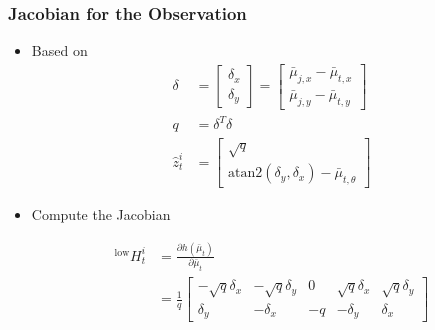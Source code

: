 \begin{frame}
    \frametitle{Jacobian for the Observation}

    \begin{itemize}
        \item Based on
        \begin{align*}
            \delta &= 
            \begin{bmatrix}
                \delta_x \\
                \delta_y
            \end{bmatrix}
            = \begin{bmatrix}
                \bar{\mu}_{j,x} - \bar{\mu}_{t,x} \\
                \bar{\mu}_{j,y} - \bar{\mu}_{t,y}
            \end{bmatrix}\\
            q &= \delta^T \delta\\
            \hat{z}^i_t &= 
            \begin{bmatrix}
                \sqrt{q} \\
                \text{atan2}(\delta_y, \delta_x) - \bar{\mu}_{t,\theta}
            \end{bmatrix}
        \end{align*}

        \item Compute the Jacobian
        
        \begin{align*}
            {}^{\text{low}}H^i_t &= \frac{\partial h(\bar{\mu}_t)}{\partial \bar{\mu}_t}\\
            &= \frac{1}{q}
            \begin{bmatrix}
                -\sqrt{q} \delta_x & -\sqrt{q} \delta_y & 0 & \sqrt{q} \delta_x & \sqrt{q} \delta_y\\
                \delta_y & -\delta_x & -q & -\delta_y & \delta_x
            \end{bmatrix}
        \end{align*}
    \end{itemize}

\end{frame}

